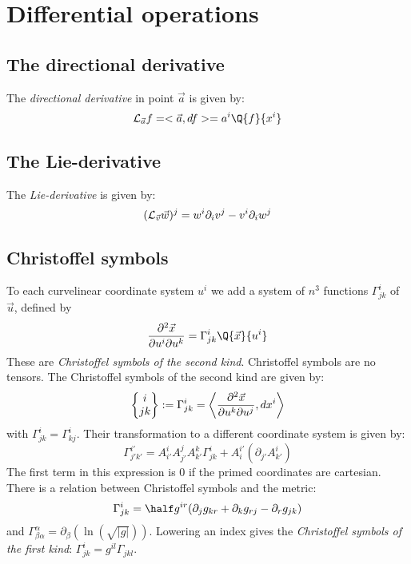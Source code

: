 \section{Differential operations}
\subsection{The directional derivative}
The {\it directional derivative} in point $\vec{a}$ is given by:
\[
{\cal L}_{\vec{a}}f=<\vec{a},df>=a^i\Q{f}{x^i}
\]

\subsection{The Lie-derivative}
The {\it Lie-derivative} is given by:
\[
({\cal L}_{\vec{v}}\vec{w})^j=w^i\partial_iv^j-v^i\partial_iw^j
\]

\subsection{Christoffel symbols}
To each curvelinear coordinate system $u^i$ we add a system of $n^3$
functions $\Gamma^i_{jk}$ of $\vec{u}$, defined by
\[
\frac{\partial^2\vec{x}}{\partial u^i\partial u^k}=\Gamma_{jk}^i\Q{\vec{x}}{u^i}
\]
These are {\it Christoffel symbols of the second kind}. Christoffel symbols
are no tensors. The Christoffel symbols of the second kind are given by:
\[
\left\{\begin{array}{@{}c@{}}i\\ jk \end{array}\right\}:=\Gamma^i_{jk}=
\left\langle\frac{\partial^2\vec{x}}{\partial u^k\partial u^j},dx^i\right\rangle
\]
with $\Gamma^i_{jk}=\Gamma^i_{kj}$. Their transformation to a different
coordinate system is given by:
\[
\Gamma_{j'k'}^{i'}=A_{i'}^iA_{j'}^jA_{k'}^k\Gamma^i_{jk}+A_i^{i'}(\partial_{j'}A_{k'}^i)
\]
The first term in this expression is 0 if the primed coordinates are
cartesian.
\npar
There is a relation between Christoffel symbols and the metric:
\[
\Gamma_{jk}^i=\half g^{ir}(\partial_j g_{kr}+\partial_k g_{rj}-\partial_r g_{jk})
\]
and $\Gamma^\alpha_{\beta\alpha}=\partial_\beta(\ln(\sqrt{|g|}))$.
\npar
Lowering an index gives the {\it Christoffel symbols of the first kind}:
$\Gamma^i_{jk}=g^{il}\Gamma_{jkl}$.

